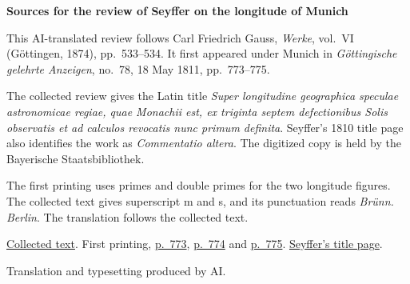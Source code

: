 \clearpage\thispagestyle{empty}
\begin{center}\textbf{Sources for the review of Seyffer on the longitude of Munich}\end{center}
\noindent This AI-translated review follows Carl Friedrich Gauss, \textit{Werke}, vol.~VI (Göttingen, 1874), pp.~533--534. It first appeared under Munich in \textit{Göttingische gelehrte Anzeigen}, no.~78, 18 May 1811, pp.~773--775.
\par\smallskip\noindent The collected review gives the Latin title \textit{Super longitudine geographica speculae astronomicae regiae, quae Monachii est, ex triginta septem defectionibus Solis observatis et ad calculos revocatis nunc primum definita}. Seyffer’s 1810 title page also identifies the work as \textit{Commentatio altera}. The digitized copy is held by the Bayerische Staatsbibliothek.
\par\smallskip\noindent The first printing uses primes and double primes for the two longitude figures. The collected text gives superscript m and s, and its punctuation reads \textit{Brünn. Berlin}. The translation follows the collected text.
\par\smallskip\noindent \href{https://gdz.sub.uni-goettingen.de/id/PPN236007467}{Collected text}. First printing, \href{https://images.p.sub.uni-goettingen.de/iiif/image/gdz:PPN319721507_1811:00000805/full/1650,/0/default.jpg}{p.~773}, \href{https://images.p.sub.uni-goettingen.de/iiif/image/gdz:PPN319721507_1811:00000806/full/1650,/0/default.jpg}{p.~774} and \href{https://images.p.sub.uni-goettingen.de/iiif/image/gdz:PPN319721507_1811:00000807/full/1650,/0/default.jpg}{p.~775}. \href{https://api.digitale-sammlungen.de/iiif/image/v2/bsb10723478_00009/full/1550,/0/default.jpg}{Seyffer’s title page}.
\par\smallskip\noindent Translation and typesetting produced by AI.
\clearpage
